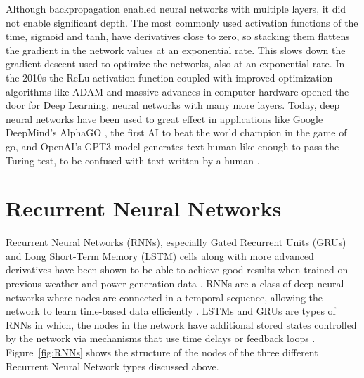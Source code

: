 Although backpropagation enabled neural networks with multiple layers, it did not enable significant depth. The most commonly used activation functions of the time, sigmoid and tanh, have derivatives close to zero, so stacking them flattens the gradient in the network values at an exponential rate. This slows down the gradient descent used to optimize the networks, also at an exponential rate. In the 2010s the ReLu activation function \cite{nair_rectified_2010} coupled with improved optimization algorithms like ADAM and massive advances in computer hardware opened the door for Deep Learning, neural networks with many more layers. Today, deep neural networks have been used to great effect in applications like Google DeepMind's AlphaGO \cite{silver_mastering_2016}, the first AI to beat the world champion in the game of go, and OpenAI's GPT3 model generates text human-like enough to pass the Turing test, to be confused with text written by a human \cite{vandeput_brief_nodate}.


\section{Recurrent Neural Networks\label{cha:RNN}}
Recurrent Neural Networks (RNNs), especially Gated Recurrent Units (GRUs) and Long Short-Term Memory (LSTM) cells \cite{Goodfellow-et-al-2016, hochreiter_long_1997} along with more advanced derivatives have been shown to be able to achieve good results when trained on previous weather and power generation data \cite{lin_temporal_2020, lee_forecasting_2018, jaidee_very_2019, su_machine_2019}.
RNNs are a class of deep neural networks where nodes are connected in a temporal sequence, allowing the network to learn time-based data efficiently \cite{lim_time_2021}. LSTMs and GRUs are types of RNNs in which, the nodes in the network have additional stored states controlled by the network via mechanisms that use time delays or feedback loops \cite{Goodfellow-et-al-2016, noauthor_recurrent_2021}. Figure~\ref{fig:RNNs} shows the structure of the nodes of the three different Recurrent Neural Network types discussed above.\\

